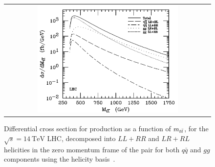 \begin{figure}[htb]
  \begin{center}
    \begin{tabular}{c}
        \includegraphics[width=0.7\textwidth]{fig_TopQuark/LHC_ttbar_helicity_differential.png}
    \end{tabular}
    \caption{Differential cross section for \ttbar production as a function of $m_{t\bar{t}}$, for the $\sqrt{s}=\SI{14}{\TeV}$ LHC, decomposed into $L L + R R$ and $L R + R L$ helicities in the zero momentum frame of the \ttbar pair for both $q\bar{q}$ and $gg$ components using the helicity basis~\cite{PhysRevD.53.4886}.
            }
    \label{LHC_ttbar_helicity_differential}
  \end{center}
\end{figure}

